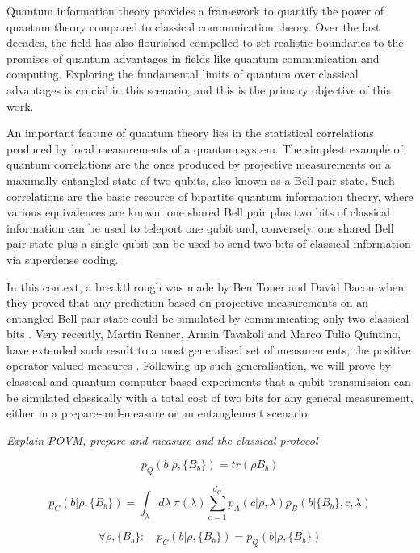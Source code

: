 Quantum information theory provides a framework to quantify the power of quantum theory compared to classical communication theory. Over the last decades, the field has also flourished compelled to set realistic boundaries to the promises of quantum advantages in fields like quantum communication and computing. Exploring the fundamental limits of quantum over classical advantages is crucial in this scenario, and this is the primary objective of this work.
\par
An important feature of quantum theory lies in the statistical correlations produced by local measurements of a quantum system. The simplest example of quantum correlations are the ones produced by projective measurements on a maximally-entangled state of two qubits, also known as a Bell pair state. Such correlations are the basic resource of bipartite quantum information theory, where various equivalences are known: one shared Bell pair plus two bits of classical information can be used to teleport one  qubit and, conversely, one shared Bell pair state plus a single qubit can be used to send two bits of classical information via superdense coding.
\par
In this context, a breakthrough was made by Ben Toner and David Bacon when they proved that any prediction based on projective measurements on an entangled Bell pair state could be simulated by communicating only two classical bits \cite{toner2003}. Very recently, Martin Renner, Armin Tavakoli and Marco Tulio Quintino, have extended such result to a most generalised set of measurements, the positive operator-valued measures \cite{renner2022}.
Following up such generalisation, we will prove by classical and quantum computer based experiments that a qubit transmission can be simulated classically with a total cost of two bits for any general measurement, either in a prepare-and-measure or an entanglement scenario.

\textit{Explain POVM, prepare and measure and the classical protocol}

\begin{equation}
p_Q(b|\rho,\{B_b\}) = tr(\rho B_b)
\end{equation}

\begin{equation}
p_C(b|\rho,\{B_b\}) = \int_{\lambda} d\lambda\ \pi(\lambda) \sum_{c=1}^{d_C} p_A(c|\rho, \lambda) p_B(b|\{B_b\}, c, \lambda)
\end{equation}

\begin{equation}
\forall \rho, \{B_b\}:\quad p_C(b|\rho,\{B_b\}) = p_Q(b|\rho,\{B_b\})
\end{equation}

